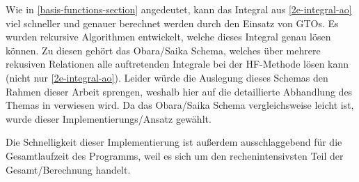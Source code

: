 Wie in \cref{basis-functions-section} angedeutet, kann das Integral aus \cref{2e-integral-ao}
viel schneller und genauer berechnet werden durch den Einsatz von GTOs.
Es wurden rekursive Algorithmen entwickelt, welche dieses Integral genau lösen können.
Zu diesen gehört das Obara\-/Saika Schema, welches über mehrere rekusiven Relationen alle
auftretenden Integrale bei der HF-Methode lösen kann (nicht nur \cref{2e-integral-ao}).
Leider würde die Auslegung dieses Schemas den Rahmen dieser Arbeit sprengen,
weshalb hier auf die detaillierte Abhandlung des Themas in
\cite[Kapitel 9 bzw. 9.10]{structure_2013} verwiesen wird.
Da das Obara\-/Saika Schema vergleichsweise leicht ist, wurde dieser Implementierungs\-/Ansatz 
gewählt.

Die Schnelligkeit dieser Implementierung ist außerdem ausschlaggebend
für die Gesamtlaufzeit des Programms, weil es sich um den
rechenintensivsten Teil der Gesamt\-/Berechnung handelt.